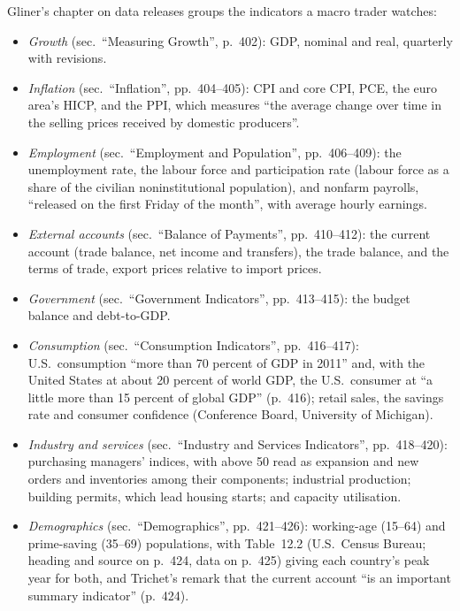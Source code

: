 \begin{qfdefinition}\label{def:macroeconomic-indicators}
 Gliner's chapter on data releases \citep[chap.~12, PDF pp.~401--428]{s7-gliner} groups the indicators a macro trader watches:
\begin{itemize}
\item \emph{Growth} (sec.\ ``Measuring Growth'', p.~402): GDP, nominal and real, quarterly with revisions.
\item \emph{Inflation} (sec.\ ``Inflation'', pp.~404--405): CPI and core CPI, PCE, the euro area's HICP, and the PPI, which measures ``the average change over time in the selling prices received by domestic producers''.
\item \emph{Employment} (sec.\ ``Employment and Population'', pp.~406--409): the unemployment rate, the labour force and participation rate (labour force as a share of the civilian noninstitutional population), and nonfarm payrolls, ``released on the first Friday of the month'', with average hourly earnings.
\item \emph{External accounts} (sec.\ ``Balance of Payments'', pp.~410--412): the current account (trade balance, net income and transfers), the trade balance, and the terms of trade, export prices relative to import prices.
\item \emph{Government} (sec.\ ``Government Indicators'', pp.~413--415): the budget balance and debt-to-GDP.
\item \emph{Consumption} (sec.\ ``Consumption Indicators'', pp.~416--417): U.S.\ consumption ``more than 70 percent of GDP in 2011'' and, with the United States at about 20 percent of world GDP, the U.S.\ consumer at ``a little more than 15 percent of global GDP'' (p.~416); retail sales, the savings rate and consumer confidence (Conference Board, University of Michigan).
\item \emph{Industry and services} (sec.\ ``Industry and Services Indicators'', pp.~418--420): purchasing managers' indices, with above 50 read as expansion and new orders and inventories among their components; industrial production; building permits, which lead housing starts; and capacity utilisation.
\item \emph{Demographics} (sec.\ ``Demographics'', pp.~421--426): working-age (15--64) and prime-saving (35--69) populations, with Table~12.2 (U.S.\ Census Bureau; heading and source on p.~424, data on p.~425) giving each country's peak year for both, and Trichet's remark that the current account ``is an important summary indicator'' (p.~424).
\end{itemize}


\end{qfdefinition}
